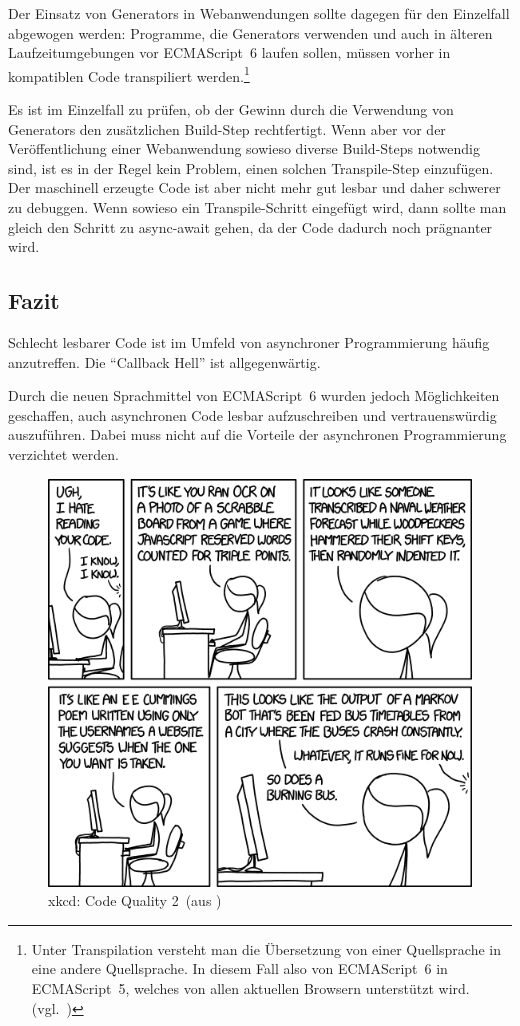 \documentclass[
11pt, %
a4paper, %
oneside, %
pdfspacing, %
headinclude,
BCOR5mm, %
ngerman, %
bibtotocnumbered,
]{scrartcl}
\begin{document}
	Der Einsatz von Generators in Webanwendungen sollte dagegen für den Einzelfall abgewogen werden: Programme, die Generators verwenden und auch in älteren Laufzeitumgebungen vor ECMAScript~6 laufen sollen, müssen  vorher in kompatiblen Code transpiliert werden.\footnote{Unter Transpilation versteht man die Übersetzung von einer Quellsprache in eine andere Quellsprache. In diesem Fall also von ECMAScript~6 in ECMAScript~5, welches von allen aktuellen Browsern unterstützt wird. (vgl.~\citep{Sengstacke.2016})}
	
	Es ist im Einzelfall zu prüfen, ob der Gewinn durch die Verwendung von Generators den zusätzlichen Build-Step rechtfertigt. Wenn aber vor der Veröffentlichung einer Webanwendung sowieso diverse Build-Steps notwendig sind, ist es in der Regel kein Problem, einen solchen Transpile-Step einzufügen. Der maschinell erzeugte Code ist aber nicht mehr gut lesbar und daher schwerer zu debuggen.
	Wenn sowieso ein Transpile-Schritt eingefügt wird, dann sollte man gleich den Schritt zu \textsf{async-await} gehen, da der Code dadurch noch prägnanter wird.
	
	\subsection*{Fazit}
	
		Schlecht lesbarer Code ist im Umfeld von asynchroner Programmierung häufig anzutreffen. Die "`Callback Hell"' ist allgegenwärtig.
		
		Durch die neuen Sprachmittel von ECMAScript~6 wurden jedoch Möglichkeiten geschaffen, auch asynchronen Code lesbar aufzuschreiben und vertrauenswürdig auszuführen. Dabei muss nicht auf die Vorteile der asynchronen Programmierung verzichtet werden.
		
		\begin{figure}[h]\label{xkcdCodeQuality2}\centering\includegraphics[width=0.55 \textwidth]{Images/code_quality_2.png}\caption[xkcd: Code Quality 2]{xkcd: Code Quality 2~(aus \citep[]{Munroe.2016})}
			
		\end{figure}
		
\end{document}
